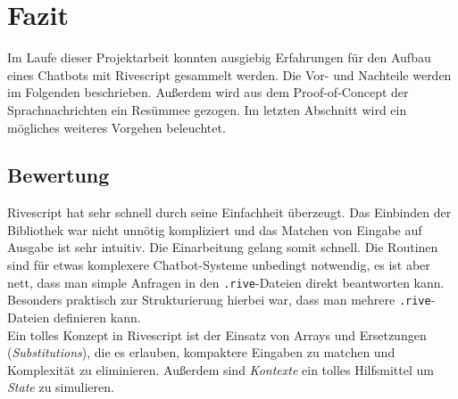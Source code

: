 \chapter{Fazit}
Im Laufe dieser Projektarbeit konnten ausgiebig Erfahrungen für den Aufbau eines Chatbots mit Rivescript gesammelt werden. Die Vor- und Nachteile werden im Folgenden beschrieben. Außerdem wird aus dem Proof-of-Concept der Sprachnachrichten ein Resümmee gezogen. Im letzten Abschnitt wird ein mögliches weiteres Vorgehen beleuchtet.

\section{Bewertung}
Rivescript hat sehr schnell durch seine Einfachheit überzeugt. Das Einbinden der Bibliothek war nicht unnötig kompliziert und das Matchen von Eingabe auf Ausgabe ist sehr intuitiv. Die Einarbeitung gelang somit schnell. Die Routinen sind für etwas komplexere Chatbot-Systeme unbedingt notwendig, es ist aber nett, dass man simple Anfragen in den \texttt{.rive}-Dateien direkt beantworten kann. Besonders praktisch zur Strukturierung hierbei war, dass man mehrere \texttt{.rive}-Dateien definieren kann.\\
Ein tolles Konzept in Rivescript ist der Einsatz von Arrays und Ersetzungen (\textit{Substitutions}), die es erlauben, kompaktere Eingaben zu matchen und Komplexität zu eliminieren. Außerdem sind \textit{Kontexte} ein tolles Hilfsmittel um \textit{State} zu simulieren.

